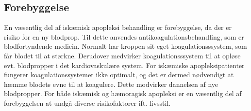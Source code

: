 \subsection{Forebyggelse}
En væsentlig del af iskæmisk apopleksi behandling er forebyggelse, da der er risiko for en ny blodprop. Til dette anvendes antikoagulationsbehandling, som er blodfortyndende medicin. Normalt har kroppen sit eget koagulationsssystem, som får blodet til at størkne. Derudover medvirker koagulationsssystem til at opløse evt. blodpropper i det kardiovaskulære system. For iskæmiske apopleksipatienter fungerer koagulationssystemet ikke optimalt, og det er dermed nødvendigt at hæmme blodets evne til at koagulere. Dette modvirker dannelsen af nye blodpropper. \cite{Kjaergaard2015}
For både iskæmisk og hæmoragisk apopleksi er en væsentlig del af forebyggelsen at undgå diverse risikofaktorer ift. livsstil. \cite{Christensen2015}



